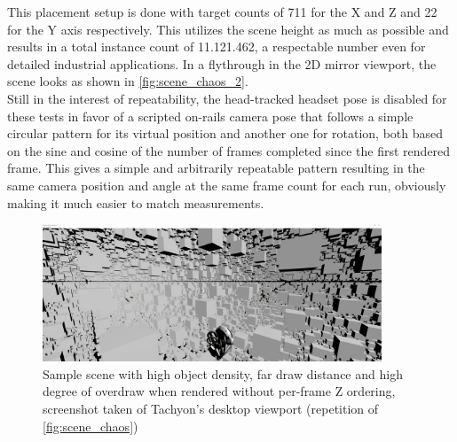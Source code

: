 This placement setup is done with target counts of 711 for the X and Z and 22 for the Y axis respectively. This utilizes the scene height as much as possible and results in a total instance count of 11.121.462, a respectable number even for detailed industrial applications. In a flythrough in the 2D mirror viewport, the scene looks as shown in \autoref{fig:scene_chaos_2}. \\
Still in the interest of repeatability, the head-tracked headset pose is disabled for these tests in favor of a scripted on-rails camera pose that follows a simple circular pattern for its virtual position and another one for rotation, both based on the sine and cosine of the number of frames completed since the first rendered frame. This gives a simple and arbitrarily repeatable pattern resulting in the same camera position and angle at the same frame count for each run, obviously making it much easier to match measurements. 

\begin{figure}[htb]
  \centering
  \includegraphics[width=0.9\textwidth]{pictures/scene_chaos}
  \caption{Sample scene with high object density, far draw distance and high degree of overdraw when rendered without per-frame Z ordering, screenshot taken of \gls{Tachyon}'s desktop viewport (repetition of \autoref{fig:scene_chaos})} \label{fig:scene_chaos_2}
\end{figure}

